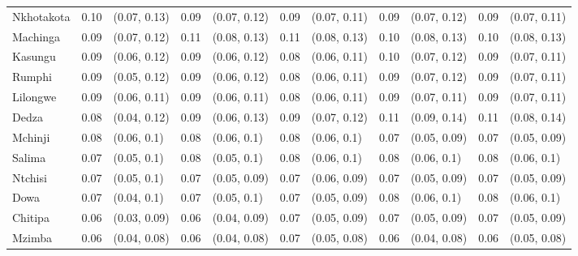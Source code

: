 \begin{tabular}{lrlrlrlrlrl}
Nkhotakota & 0.10 & (0.07, 0.13) & 0.09 & (0.07, 0.12) & 0.09 & (0.07, 0.11) & 0.09 & (0.07, 0.12) & 0.09 & (0.07, 0.11)\\
Machinga & 0.09 & (0.07, 0.12) & 0.11 & (0.08, 0.13) & 0.11 & (0.08, 0.13) & 0.10 & (0.08, 0.13) & 0.10 & (0.08, 0.13)\\
Kasungu & 0.09 & (0.06, 0.12) & 0.09 & (0.06, 0.12) & 0.08 & (0.06, 0.11) & 0.10 & (0.07, 0.12) & 0.09 & (0.07, 0.11)\\
Rumphi & 0.09 & (0.05, 0.12) & 0.09 & (0.06, 0.12) & 0.08 & (0.06, 0.11) & 0.09 & (0.07, 0.12) & 0.09 & (0.07, 0.11)\\
Lilongwe & 0.09 & (0.06, 0.11) & 0.09 & (0.06, 0.11) & 0.08 & (0.06, 0.11) & 0.09 & (0.07, 0.11) & 0.09 & (0.07, 0.11)\\
Dedza & 0.08 & (0.04, 0.12) & 0.09 & (0.06, 0.13) & 0.09 & (0.07, 0.12) & 0.11 & (0.09, 0.14) & 0.11 & (0.08, 0.14)\\
Mchinji & 0.08 & (0.06, 0.1) & 0.08 & (0.06, 0.1) & 0.08 & (0.06, 0.1) & 0.07 & (0.05, 0.09) & 0.07 & (0.05, 0.09)\\
Salima & 0.07 & (0.05, 0.1) & 0.08 & (0.05, 0.1) & 0.08 & (0.06, 0.1) & 0.08 & (0.06, 0.1) & 0.08 & (0.06, 0.1)\\
Ntchisi & 0.07 & (0.05, 0.1) & 0.07 & (0.05, 0.09) & 0.07 & (0.06, 0.09) & 0.07 & (0.05, 0.09) & 0.07 & (0.05, 0.09)\\
Dowa & 0.07 & (0.04, 0.1) & 0.07 & (0.05, 0.1) & 0.07 & (0.05, 0.09) & 0.08 & (0.06, 0.1) & 0.08 & (0.06, 0.1)\\
Chitipa & 0.06 & (0.03, 0.09) & 0.06 & (0.04, 0.09) & 0.07 & (0.05, 0.09) & 0.07 & (0.05, 0.09) & 0.07 & (0.05, 0.09)\\
Mzimba & 0.06 & (0.04, 0.08) & 0.06 & (0.04, 0.08) & 0.07 & (0.05, 0.08) & 0.06 & (0.04, 0.08) & 0.06 & (0.05, 0.08)\\
\bottomrule
\end{tabular}
